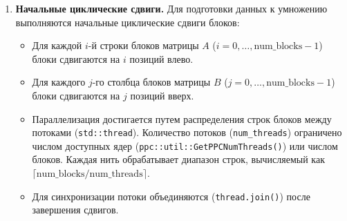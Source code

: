 \documentclass[a4paper,12pt]{article}
\begin{document}
\begin{enumerate}
    \item \textbf{Начальные циклические сдвиги.}
    Для подготовки данных к умножению выполняются начальные циклические сдвиги блоков:
    \begin{itemize}
        \item Для каждой \( i \)-й строки блоков матрицы \( A \) (\( i = 0, \dots, \text{num\_blocks} - 1 \)) блоки сдвигаются на \( i \) позиций влево.
        \item Для каждого \( j \)-го столбца блоков матрицы \( B \) (\( j = 0, \dots, \text{num\_blocks} - 1 \)) блоки сдвигаются на \( j \) позиций вверх.
        \item Параллелизация достигается путем распределения строк блоков между потоками (\texttt{std::thread}). Количество потоков (\texttt{num\_threads}) ограничено числом доступных ядер (\texttt{ppc::util::GetPPCNumThreads()}) или числом блоков. Каждая нить обрабатывает диапазон строк, вычисляемый как \( \lceil \text{num\_blocks} / \text{num\_threads} \rceil \).
        \item Для синхронизации потоки объединяются (\texttt{thread.join()}) после завершения сдвигов.
    \end{itemize}


\end{enumerate}
\end{document}
